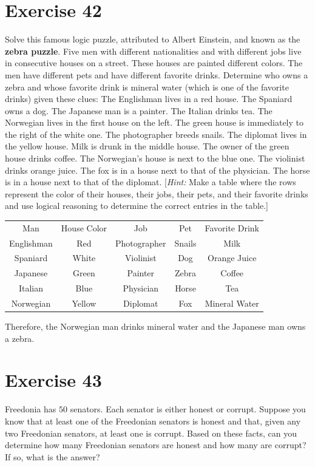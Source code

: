 \documentclass{Axon}
\begin{document}
\section*{Exercise 42}
Solve this famous logic puzzle, attributed to Albert Einstein, and known as the \textbf{zebra puzzle}. Five men with different nationalities and with different jobs live in consecutive houses on a street. These houses are painted different colors. The men have different pets and have different favorite drinks. Determine who owns a zebra and whose favorite drink is mineral water (which is one of the favorite drinks) given these clues: The Englishman lives in a red house. The Spaniard owns a dog. The Japanese man is a painter. The Italian drinks tea. The Norwegian lives in the first house on the left. The green house is immediately to the right of the white one. The photographer breeds snails. The diplomat lives in the yellow house. Milk is drunk in the middle house. The owner of the green house drinks coffee. The Norwegian's house is next to the blue one. The violinist drinks orange juice. The fox is in a house next to that of the physician. The horse is in a house next to that of the diplomat. [\textit{Hint:} Make a table where the rows represent the color of their houses, their jobs, their pets, and their favorite drinks and use logical reasoning to determine the correct entries in the table.]

\begin{table}[h]
    \centering
    \begin{tabular}{c|c|c|c|c}
        Man        & House Color & Job          & Pet    & Favorite Drink \\
        Englishman & Red         & Photographer & Snails & Milk           \\
        Spaniard   & White       & Violinist    & Dog    & Orange Juice   \\
        Japanese   & Green       & Painter      & Zebra  & Coffee         \\
        Italian    & Blue        & Physician    & Horse  & Tea            \\
        Norwegian  & Yellow      & Diplomat     & Fox    & Mineral Water              
    \end{tabular}
\end{table}

Therefore, the Norwegian man drinks mineral water and the Japanese man owns a zebra.

\section*{Exercise 43}
Freedonia has \(50\) senators. Each senator is either honest or corrupt. Suppose you know that at least one of the Freedonian senators is honest and that, given any two Freedonian senators, at least one is corrupt. Based on these facts, can you determine how many Freedonian senators are honest and how many are corrupt? If so, what is the answer?
\end{document}
